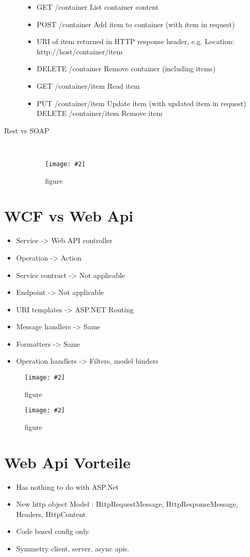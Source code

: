 \documentclass[a4paper,10pt]{scrreprt}
\newcommand{\pic}[2][figure]{\begin{figure}[h]
 \centering
 \texttt{[image: \#2]}
 \caption{#1}
\end{figure}
}
\begin{document}
\begin{description}
\begin{itemize}
\item GET /container List container content
\item POST /container Add item to container (with item in
    request)
\item URI of item returned in HTTP response header, e.g.
Location: http://host/container/item
\item DELETE /container
Remove container (including items)
\item GET /container/item Read item
\item PUT /container/item Update item (with updated item in request)
    DELETE /container/item Remove item 
\end{itemize}
\item[Rest vs SOAP] \hfill \\
\pic{rvs.png}

\end{description}

\section{WCF vs Web Api}
\begin{itemize}
 \item Service -> Web API controller
\item Operation -> Action
\item Service contract -> Not applicable
\item Endpoint -> Not applicable
\item URI templates -> ASP.NET Routing
\item Message handlers -> Same
\item Formatters -> Same
\item Operation handlers -> Filters, model binders
\end{itemize}
\pic{wcfwebapi.png}
\pic{wcfwapi2.png}

\section{Web Api Vorteile}
\begin{itemize}  \item Has
nothing to do with ASP.Net
\item New http object Model : HttpRequestMessage, HttpResponseMessage,
Headers, HttpContent
\item Code based config only.
\item Symmetry client, server, async apis.
\end{itemize}
\end{document}
